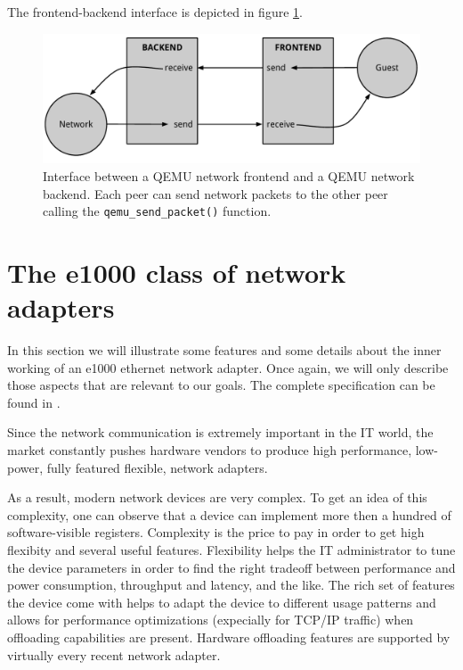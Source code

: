 The frontend-backend interface is depicted in figure \ref{fig:frontback}.

\begin{figure}[bt]
\centering
\includegraphics[scale = 0.60]{frontend-backend.pdf}
\caption{Interface between a QEMU network frontend and a QEMU network backend. Each peer can send network packets to the other peer
	calling the \texttt{qemu\_send\_packet()} function.}
\label{fig:frontback}
\end{figure}



\section{The e1000 class of network adapters}
\label{sec:e1000-hardware}
In this section we will illustrate some features and some details about the inner working of an e1000 ethernet network adapter.
Once again, we will only describe those aspects that are relevant to our goals.
The complete specification can be found in \cite{ref:e1000}.

\vspace{0.5cm}

Since the network communication is extremely important in the IT world, the market constantly pushes hardware vendors to produce high
performance, low-power, fully featured flexible, network adapters.

As a result, modern network devices are very complex. To get an idea of this complexity, one can observe that a device can implement 
more then a hundred of software-visible registers. Complexity is the price to pay in order to get high flexibity and several useful
features. Flexibility helps the IT administrator to tune the device parameters in order to find the right tradeoff between performance and 
power consumption, throughput and latency, and the like.
The rich set of features the device come with helps to adapt the device to different usage patterns and allows for performance 
optimizations (expecially for TCP/IP traffic) when offloading capabilities are present.
Hardware offloading features are supported by virtually every recent network adapter.

